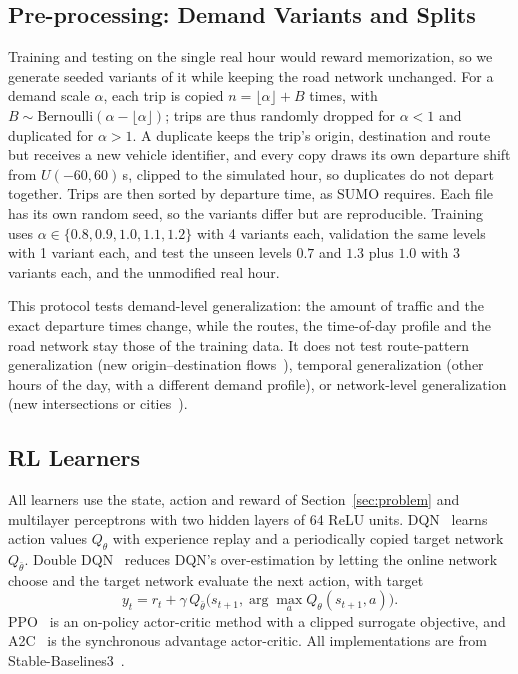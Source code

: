 \subsection{Pre-processing: Demand Variants and Splits}
\label{sec:splits}
Training and testing on the single real hour would reward memorization, so we generate seeded variants of it while keeping the road network unchanged. For a demand scale $\alpha$, each trip is copied $n = \lfloor \alpha \rfloor + B$ times, with $B \sim \mathrm{Bernoulli}(\alpha - \lfloor \alpha \rfloor)$; trips are thus randomly dropped for $\alpha<1$ and duplicated for $\alpha>1$. A duplicate keeps the trip's origin, destination and route but receives a new vehicle identifier, and every copy draws its own departure shift from $U(-60, 60)$\,s, clipped to the simulated hour, so duplicates do not depart together. Trips are then sorted by departure time, as SUMO requires. Each file has its own random seed, so the variants differ but are reproducible. Training uses $\alpha \in \{0.8, 0.9, 1.0, 1.1, 1.2\}$ with 4 variants each, validation the same levels with 1 variant each, and test the unseen levels $0.7$ and $1.3$ plus $1.0$ with 3 variants each, and the unmodified real hour.

This protocol tests demand-level generalization: the amount of traffic and the exact departure times change, while the routes, the time-of-day profile and the road network stay those of the training data. It does not test route-pattern generalization (new origin--destination flows~\cite{kwesiga2026robustness}), temporal generalization (other hours of the day, with a different demand profile), or network-level generalization (new intersections or cities~\cite{wang2024unitsa,gu2024pilight}).

\subsection{RL Learners}
All learners use the state, action and reward of Section~\ref{sec:problem} and multilayer perceptrons with two hidden layers of 64 ReLU units. DQN~\cite{mnih2015dqn} learns action values $Q_\theta$ with experience replay and a periodically copied target network $Q_{\bar\theta}$. Double DQN~\cite{vanhasselt2016ddqn} reduces DQN's over-estimation by letting the online network choose and the target network evaluate the next action, with target
\begin{equation}
  y_t = r_t + \gamma\, Q_{\bar\theta}\big(s_{t+1}, \arg\max_{a} Q_{\theta}(s_{t+1}, a)\big).
\end{equation}
PPO~\cite{schulman2017ppo} is an on-policy actor-critic method with a clipped surrogate objective, and A2C~\cite{mnih2016a3c} is the synchronous advantage actor-critic. All implementations are from Stable-Baselines3~\cite{raffin2021sb3}.

